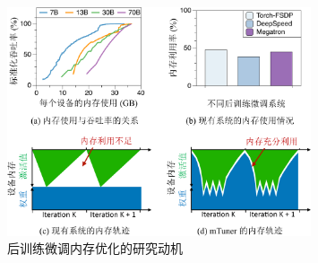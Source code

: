 \begin{figure}[ht]
     \centering
     \includegraphics[width=0.8\textwidth]{figures/mtuner/intro-crop.pdf}
        \caption{
        后训练微调内存优化的研究动机
        }
        \label{fig:mtuner-intro}
\end{figure}


